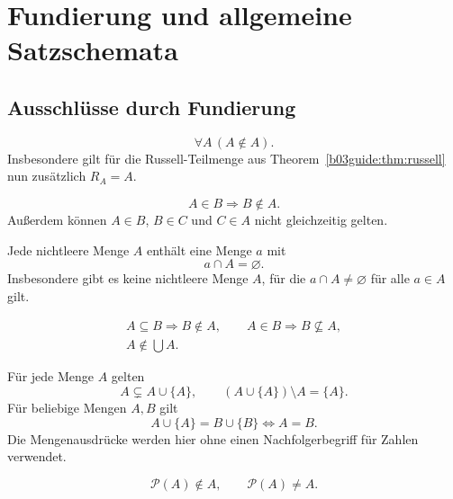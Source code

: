 \chapter{Fundierung und allgemeine Satzschemata}

\section{Ausschlüsse durch Fundierung}

\begin{theorem}
\label{b03guide:thm:noself}
\[
 \forall A\,(A\notin A).
\]
Insbesondere gilt für die Russell-Teilmenge aus
Theorem~\ref{b03guide:thm:russell} nun zusätzlich $R_A=A$.
\end{theorem}

\begin{theorem}
\[
 A\in B\Rightarrow B\notin A.
\]
Außerdem können $A\in B$, $B\in C$ und $C\in A$ nicht
gleichzeitig gelten.
\end{theorem}

\begin{theorem}
Jede nichtleere Menge $A$ enthält eine Menge $a$ mit
\[
 a\cap A=\varnothing.
\]
Insbesondere gibt es keine nichtleere Menge $A$, für die
$a\cap A\ne\varnothing$ für alle $a\in A$ gilt.
\end{theorem}

\begin{theorem}
\[
\begin{gathered}
 A\subseteq B\Rightarrow B\notin A,\qquad
 A\in B\Rightarrow B\nsubseteq A,\\
 A\notin\bigcup A.
\end{gathered}
\]
\end{theorem}

\begin{theorem}
Für jede Menge $A$ gelten
\[
 A\subsetneq A\cup\{A\},\qquad
 (A\cup\{A\})\setminus A=\{A\}.
\]
Für beliebige Mengen $A,B$ gilt
\[
 A\cup\{A\}=B\cup\{B\}\Longleftrightarrow A=B.
\]
Die Mengenausdrücke werden hier ohne einen Nachfolgerbegriff
für Zahlen verwendet.
\end{theorem}

\begin{theorem}
\[
 \mathcal P(A)\notin A,\qquad \mathcal P(A)\ne A.
\]
\end{theorem}

